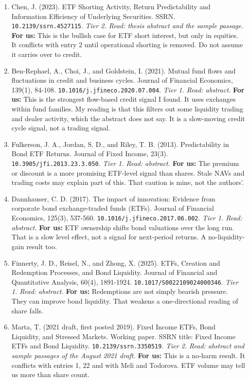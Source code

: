 \begin{enumerate}[leftmargin=*,itemsep=3pt]
\item Chen, J. (2023). ETF Shorting Activity, Return Predictability and Information Efficiency of Underlying Securities. SSRN. \nolinkurl{10.2139/ssrn.4527115}. \emph{Tier 2. Read: thesis abstract and the sample passage.} \textbf{For us:} This is the bullish case for ETF short interest, but only in equities. It conflicts with entry 2 until operational shorting is removed. Do not assume it carries over to credit.
\item Ben-Rephael, A., Choi, J., and Goldstein, I. (2021). Mutual fund flows and fluctuations in credit and business cycles. Journal of Financial Economics, 139(1), 84-108. \nolinkurl{10.1016/j.jfineco.2020.07.004}. \emph{Tier 1. Read: abstract.} \textbf{For us:} This is the strongest flow-based credit signal I found. It uses exchanges within fund families. My reading is that this filters out some liquidity trading and dealer activity, which the abstract does not say. It is a slow-moving credit cycle signal, not a trading signal.
\item Fulkerson, J. A., Jordan, S. D., and Riley, T. B. (2013). Predictability in Bond ETF Returns. Journal of Fixed Income, 23(3). \nolinkurl{10.3905/jfi.2013.23.3.050}. \emph{Tier 1. Read: abstract.} \textbf{For us:} The premium or discount is a more promising ETF-level signal than shares. Stale NAVs and trading costs may explain part of this. That caution is mine, not the authors'.
\item Dannhauser, C. D. (2017). The impact of innovation: Evidence from corporate bond exchange-traded funds (ETFs). Journal of Financial Economics, 125(3), 537-560. \nolinkurl{10.1016/j.jfineco.2017.06.002}. \emph{Tier 1. Read: abstract.} \textbf{For us:} ETF ownership shifts bond valuations over the long run. That is a slow level effect, not a signal for next-period returns. A no-liquidity-gain result too.
\item Finnerty, J. D., Reisel, N., and Zhong, X. (2025). ETFs, Creation and Redemption Processes, and Bond Liquidity. Journal of Financial and Quantitative Analysis, 60(4), 1891-1924. \nolinkurl{10.1017/S0022109024000346}. \emph{Tier 1. Read: abstract.} \textbf{For us:} Redemptions are not simply bearish pressure. They can improve bond liquidity. That weakens a one-directional reading of share falls.
\item Marta, T. (2021 draft, first posted 2019). Fixed Income ETFs, Bond Liquidity, and Stressed Markets. Working paper. SSRN title: Fixed Income ETFs and Bond Liquidity. \nolinkurl{10.2139/ssrn.3350519}. \emph{Tier 2. Read: abstract and sample passages of the August 2021 draft.} \textbf{For us:} This is a no-harm result. It conflicts with entries 1, 22 and with Meli and Todorova. ETF volume may tell us more than share count.

\end{enumerate}
